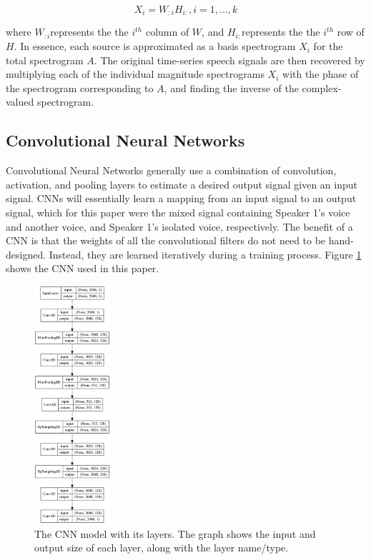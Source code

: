 \documentclass[12pt,chapterheads]{ucsd}
\begin{document}
\begin{equation}
X_i = W_{:i}H_{i:}, i=1,...,k
\end{equation}

where $W_{:i} $represents the the $i^{th}$ column of $W$, and $H_{i:} $represents the the $i^{th}$ row of $H$. In essence, each source is approximated as a basis spectrogram $X_i$ for the total spectrogram $A$. The original time-series speech signals are then recovered by multiplying each of the individual magnitude spectrograms $X_i$ with the phase of the spectrogram corresponding to $A$, and finding the inverse of the complex-valued spectrogram.

\subsection{Convolutional Neural Networks}
Convolutional Neural Networks generally use a combination of convolution, activation, and pooling layers to estimate a desired output signal given an input signal. CNNs will essentially learn a mapping from an input signal to an output signal, which for this paper were the mixed signal containing Speaker 1's voice and another voice, and Speaker 1's isolated voice, respectively. The benefit of a CNN is that the weights of all the convolutional filters do not need to be hand-designed. Instead, they are learned iteratively during a training process. Figure \ref{fig:cnn_model} shows the CNN used in this paper.

\begin{figure}[h] 
  \centering
  \includegraphics[width=0.25\textwidth]{pics/model}
  \caption[The CNN model and its layers]
{The CNN model with its layers. The graph shows the input and output size of each layer, along with the layer name/type.}
  \label{fig:cnn_model}
\end{figure}
\end{document}
